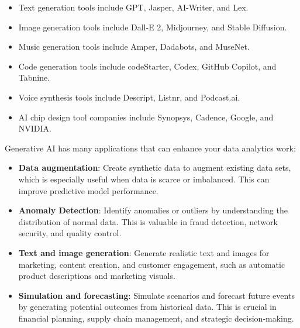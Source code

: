 \documentclass[12pt]{report}
\theoremstyle{largebreak}
\begin{document}
    \begin{itemize}
        \item Text generation tools include GPT, Jasper, AI-Writer, and Lex.
        
        \item Image generation tools include Dall-E 2, Midjourney, and Stable Diffusion.
        
        \item Music generation tools include Amper, Dadabots, and MuseNet.
        
        \item Code generation tools include codeStarter, Codex, GitHub Copilot, and Tabnine.
        
        \item Voice synthesis tools include Descript, Listnr, and Podcast.ai.
        
        \item AI chip design tool companies include Synopsys, Cadence, Google, and NVIDIA.
    \end{itemize}

    \begin{obs}
        Generative AI has many applications that can enhance your data analytics work:

        \begin{itemize}
            \item \textbf{Data augmentation}: Create synthetic data to augment existing data sets, which is especially useful when data is scarce or imbalanced. This can improve predictive model performance.
    
            \item \textbf{Anomaly Detection}: Identify anomalies or outliers by understanding the distribution of normal data. This is valuable in fraud detection, network security, and quality control.
    
            \item \textbf{Text and image generation}: Generate realistic text and images for marketing, content creation, and customer engagement, such as automatic product descriptions and marketing visuals.
    
            \item \textbf{Simulation and forecasting}: Simulate scenarios and forecast future events by generating potential outcomes from historical data. This is crucial in financial planning, supply chain management, and strategic decision-making.
        \end{itemize}
    \end{obs}
\end{document}
